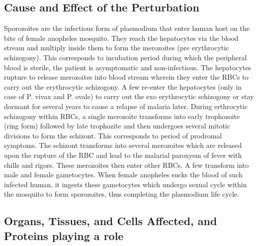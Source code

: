 \documentclass[twoside]{article}
\begin{document}
\begin{multicols}{2}

    \subsection*{Cause and Effect of the Perturbation}
    Sporozoites are the infectious form of plasmodium that enter human host on the bite of female anopheles mosquito. 
    They reach the hepatocytes via the blood stream and multiply inside them to form the merozoites (pre erythrocytic schizogony). 
    This corresponds to incubation period during which the peripheral blood is sterile, the patient is asymptomatic and non-infectious. 
    The hepatocytes rupture to release merozoites into blood stream wherein they enter the RBCs to carry out the erythrocytic schizogony. 
    A few re-enter the hepatocytes (only in case of P. vivax and P. ovale) to carry out the exo erythrocytic schizogony or stay dormant for 
    several years to cause a relapse of malaria later. During erthrocytic schizogony within RBCs, a single merozoite transforms into early trophozoite (ring form) 
    followed by late trophozite and then undergoes several mitotic divisions to form the schizont. This corresponds to period of prodromal symptoms. 
    The schizont transforms into several merozoites which are released upon the rupture of the RBC and lead to the malarial paroxysm of fever with chills and rigors. 
    These merozoites then enter other RBCs. A few transform into male and female gametocytes. When female anopheles sucks the blood of such infected human, 
    it ingests these gametocytes which undergo sexual cycle within the mosquito to form sporozoites, thus completing the plasmodium life cycle. 
    
    
    
    \subsection*{Organs, Tissues, and Cells Affected, and Proteins playing a role}


\end{multicols}
\end{document}
